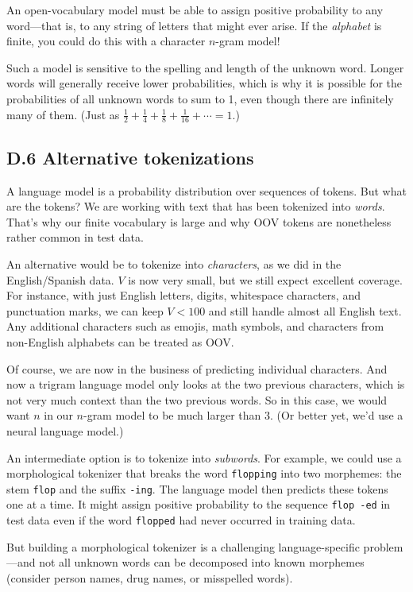 An open-vocabulary model must be able to assign positive probability to any word—that is, to any string of letters that might ever arise. If the \textit{alphabet} is finite, you could do this with a character $n$-gram model!

Such a model is sensitive to the spelling and length of the unknown word. Longer words will generally receive lower probabilities, which is why it is possible for the probabilities of all unknown words to sum to 1, even though there are infinitely many of them. (Just as $\tfrac{1}{2} + \tfrac{1}{4} + \tfrac{1}{8} + \tfrac{1}{16} + \cdots = 1.$)

\subsection*{D.6 Alternative tokenizations}

A language model is a probability distribution over sequences of tokens. But what are the tokens? We are working with text that has been tokenized into \textit{words}. That’s why our finite vocabulary is large and why OOV tokens are nonetheless rather common in test data.

An alternative would be to tokenize into \textit{characters}, as we did in the English/Spanish data. $V$ is now very small, but we still expect excellent coverage. For instance, with just English letters, digits, whitespace characters, and punctuation marks, we can keep $V < 100$ and still handle almost all English text. Any additional characters such as emojis, math symbols, and characters from non-English alphabets can be treated as OOV.

Of course, we are now in the business of predicting individual characters. And now a trigram language model only looks at the two previous characters, which is not very much context than the two previous words. So in this case, we would want $n$ in our $n$-gram model to be much larger than 3. (Or better yet, we’d use a neural language model.)

An intermediate option is to tokenize into \textit{subwords}. For example, we could use a morphological tokenizer that breaks the word \texttt{flopping} into two morphemes: the stem \texttt{flop} and the suffix \texttt{-ing}. The language model then predicts these tokens one at a time. It might assign positive probability to the sequence \texttt{flop -ed} in test data even if the word \texttt{flopped} had never occurred in training data.

But building a morphological tokenizer is a challenging language-specific problem—and not all unknown words can be decomposed into known morphemes (consider person names, drug names, or misspelled words).

